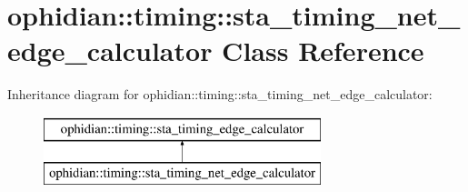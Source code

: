 \hypertarget{classophidian_1_1timing_1_1sta__timing__net__edge__calculator}{\section{ophidian\-:\-:timing\-:\-:sta\-\_\-timing\-\_\-net\-\_\-edge\-\_\-calculator Class Reference}
\label{classophidian_1_1timing_1_1sta__timing__net__edge__calculator}
}
Inheritance diagram for ophidian\-:\-:timing\-:\-:sta\-\_\-timing\-\_\-net\-\_\-edge\-\_\-calculator\-:\begin{figure}[H]
\begin{center}
\leavevmode
\includegraphics[height=2.000000cm]{classophidian_1_1timing_1_1sta__timing__net__edge__calculator}
\end{center}
\end{figure}
